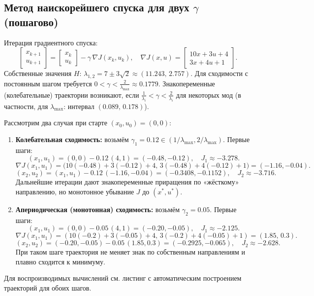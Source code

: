 \subsection{Метод наискорейшего спуска для двух \(\gamma\) (пошагово)}
Итерация градиентного спуска:
\[
\begin{bmatrix}x_{k+1}\\ u_{k+1}\end{bmatrix}=\begin{bmatrix}x_k\\ u_k\end{bmatrix}-\gamma\,\nabla J(x_k,u_k),\quad \nabla J(x,u)=\begin{bmatrix}10x+3u+4\\3x+4u+1\end{bmatrix}.
\]
Собственные значения \(H\): \(\lambda_{1,2}=7\pm3\sqrt{2}\approx(11.243,\,2.757)\). Для сходимости с постоянным шагом требуется \(0<\gamma<\tfrac{2}{\lambda_{\max}}\approx0.1779\). Знакопеременные (колебательные) траектории возникают, если \(\tfrac{1}{\lambda_i}<\gamma<\tfrac{2}{\lambda_i}\) для некоторых мод (в частности, для \(\lambda_{\max}\): интервал \((0.089,\,0.178)\)).

Рассмотрим два случая при старте \((x_0,u_0)=(0,0)\):
\begin{enumerate}
 \item \textbf{Колебательная сходимость:} возьмём \(\gamma_1=0.12\in(1/\lambda_{\max},2/\lambda_{\max})\). Первые шаги:
 \[
 (x_1,u_1)=(0,0)-0.12\,(4,1)=(-0.48,-0.12),\quad J_1\approx-3.278.
 \]
 \[
 \nabla J(x_1,u_1)=\big(10(-0.48)+3(-0.12)+4,\,3(-0.48)+4(-0.12)+1\big)
 = (-1.16,-0.04).
 \]
 \[
 (x_2,u_2)=(x_1,u_1)-0.12\,(-1.16,-0.04)=(-0.3408,-0.1152),\quad
J_2\approx-3.716.
\]
 Дальнейшие итерации дают знакопеременные приращения по «жёсткому» направлению, но монотонное убывание \(J\) до \((x^{\ast},u^{\ast})\).
 \item \textbf{Апериодическая (монотонная) сходимость:} возьмём \(\gamma_2=0.05\). Первые шаги:
 \[
 (x_1,u_1)=(0,0)-0.05\,(4,1)=(-0.20,-0.05),\quad J_1\approx-2.125.
 \]
 \[
 \nabla J(x_1,u_1)=(10(-0.2)+3(-0.05)+4,\,3(-0.2)+4(-0.05)+1)=(1.85,\,0.3).
 \]
 \[
 (x_2,u_2)=(-0.20,-0.05)-0.05\,(1.85,0.3)=(-0.2925,-0.065),\quad
J_2\approx-2.628.
\]
 При таком шаге траектория не меняет знак по собственным направлениям и плавно сходится к минимуму.
\end{enumerate}
Для воспроизводимых вычислений см. листинг с автоматическим построением траекторий для обоих шагов.

